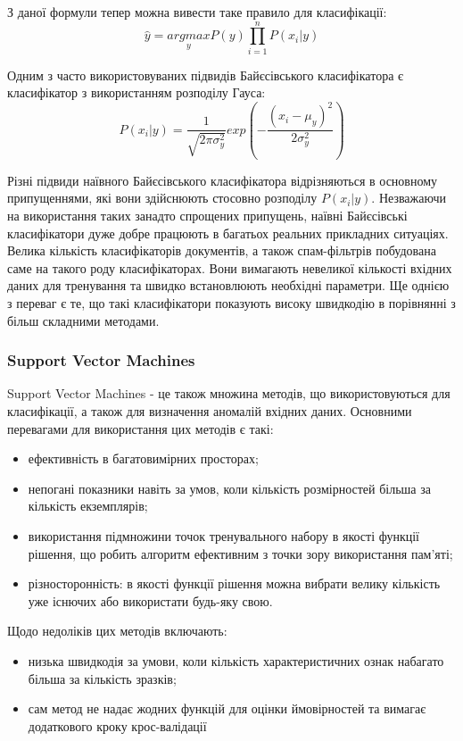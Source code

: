 З даної формули тепер можна вивести таке правило для класифікації:
\begin{equation}
    \label{eq:naive_bayes_3}
    \hat{y} = \underset{y}{argmax}P(y)\prod_{i=1}^n P(x_{i}|y)
\end{equation}

Одним з часто використовуваних підвидів Байєсівського класифікатора є класифікатор з використанням розподілу Гауса:
\begin{equation}
    \label{eq:naive_bayes_4}
    P(x_{i}|y) = \frac{1}{\sqrt{2\pi\sigma_{y}^2}}exp(-\frac{(x_{i}-\mu_{y})^2}{2\sigma_{y}^2})
\end{equation}

Різні підвиди наївного Байєсівського класифікатора відрізняються в основному припущеннями, які вони здійснюють стосовно розподілу $P(x_{i}|y)$. Незважаючи на використання таких занадто спрощених припущень, наївні Байєсівські класифікатори дуже добре працюють в багатьох реальних прикладних ситуаціях. Велика кількість класифікаторів документів, а також спам-фільтрів побудована саме на такого роду класифікаторах. Вони вимагають невеликої кількості вхідних даних для тренування та швидко встановлюють необхідні параметри. Ще однією з переваг є те, що такі класифікатори показують високу швидкодію в порівнянні з більш складними методами.


\subsubsection{Support Vector Machines}
Support Vector Machines - це також множина методів, що використовуються для класифікації, а також для визначення аномалій вхідних даних. Основними перевагами для використання цих методів є такі:
\begin{itemize}  
	\item ефективність в багатовимірних просторах;
	\item непогані показники навіть за умов, коли кількість розмірностей більша за кількість екземплярів;
	\item використання підмножини точок тренувального набору в якості функції рішення, що робить алгоритм ефективним з точки зору використання пам'яті;
	\item різносторонність: в якості функції рішення можна вибрати велику кількість уже існючих або використати будь-яку свою.
\end{itemize}

Щодо недоліків цих методів включають:
\begin{itemize}  
	\item низька швидкодія за умови, коли кількість характеристичних ознак набагато більша за кількість зразків;
	\item сам метод не надає жодних функцій для оцінки ймовірностей та вимагає додаткового кроку крос-валідації
\end{itemize}

